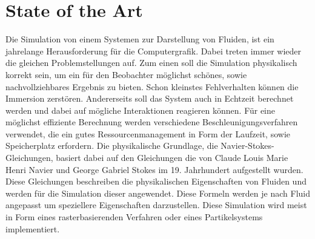 \documentclass[intern,palatino]{cgBA}
\begin{document}
\section{State of the Art}\label{state}
Die Simulation von einem Systemen zur Darstellung von Fluiden, ist ein jahrelange Herausforderung für die Computergrafik. Dabei treten immer wieder die gleichen Problemstellungen auf. Zum einen soll die Simulation physikalisch korrekt sein, um ein für den Beobachter möglichst schönes, sowie nachvollziehbares Ergebnis zu bieten. Schon kleinstes Fehlverhalten können die Immersion zerstören. Andererseits soll das System auch in Echtzeit berechnet werden und dabei auf mögliche Interaktionen reagieren können. Für eine möglichst effiziente Berechnung werden verschiedene Beschleunigungsverfahren verwendet, die ein gutes Ressourcenmanagement in Form der Laufzeit, sowie Speicherplatz erfordern.
\newline \newline
Die physikalische Grundlage, die Navier-Stokes-Gleichungen, basiert dabei auf den Gleichungen die von Claude Louis Marie Henri Navier und George Gabriel Stokes im 19. Jahrhundert aufgestellt wurden. Diese Gleichungen beschreiben die physikalischen Eigenschaften von Fluiden und werden für die Simulation dieser angewendet. Diese Formeln werden je nach Fluid angepasst um speziellere Eigenschaften darzustellen\cite{temam1978navier}.
\newline
Diese Simulation wird meist in Form eines rasterbasierenden Verfahren oder eines Partikelsystems implementiert.
\end{document}
